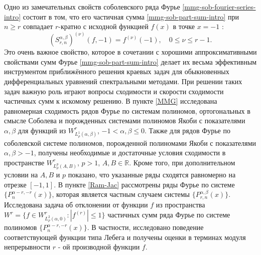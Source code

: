 Одно из замечательных свойств соболевского ряда Фурье \eqref{mmg-sob-fourier-series-intro} состоит в том, что его частичная сумма \eqref{mmg-sob-part-sum-intro} при $n \ge r$ совпадает $r$-кратно с исходной функцией $f(x)$ в точке $x=-1$ \cite[с. 228]{mmg-Shii-izvran2018}:
\begin{equation*}
	(S^{\alpha,\beta}_{r,n})^{(\nu)}(f,-1)=f^{(\nu)}(-1), \quad 0\le\nu\le r-1.
\end{equation*}
Это очень важное свойство, которое в сочетании с хорошими аппроксимативными свойствами сумм Фурье \eqref{mmg-sob-part-sum-intro}
делает их весьма эффективным инструментом приближённого решения краевых задач для обыкновенных дифференциальных уравнений спектральными методами. При решении таких задач важную роль играют вопросы сходимости и скорости сходимости частичных сумм к искомому решению.
В пункте \ref{MMG} исследована равномерная сходимость рядов Фурье по системам полиномов, ортогональных в смысле Соболева и порожденных системами полиномов Якоби с показателями $\alpha, \beta$ для функций из $W^r_{L^1_\rho(\alpha,\beta)}$, $-1 <\alpha, \beta  \le 0$. Также для рядов Фурье по соболевской системе полиномов, порожденной полиномами Якоби с показателями $\alpha, \beta  > -1$, получены необходимые и достаточные условия сходимости в пространстве $W^r_{L^p_\rho(A,B)}$, $p > 1$, $A, B \in \mathbb{R}$. Кроме того, при дополнительном условии на $A, B$ и $p$ показано, что указанные ряды сходятся равномерно на отрезке $[-1,1]$.
В пункте \ref{Ram-Jac} рассмотрены ряды Фурье по системе $\{P_n^{\alpha-r,-r}(x)\}$, которая является частным случаем системы $\{P_{r,n}^{\alpha,\beta}(x)\}$. Исследована задача об отклонении от функции $f$ из пространства $W^r=\{f\in W^r_{L^2_\rho(\alpha,0)}: |f^{(r)}|\le1\}$ частичных сумм ряда Фурье по системе полиномов $\{P_n^{\alpha-r,-r}(x)\}$. В частности, исследовано поведение соответствующей функции типа Лебега и получены оценки в терминах модуля непрерывности $r$ - ой производной функции $f$.

